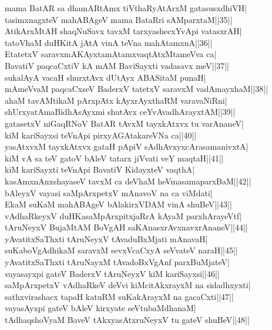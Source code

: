 \documentclass{article}
\begin{document}
mama BatAR sa dhamARtAmx tiVthaRyAtArxM gatasusxdhiVH|\\
tasimxnagxteV mahABAgeV mama BataRri sAMparxtaM||35||\\
AtikArxMtAH shaqNuSavx tavxM tarxyashecxYvApi vatasxrAH|\\
tatoVhaM duHKitA jAtA vinA teVna mahAtamxnA||36||\\
EtatetxV saravxmAKAyxtamAtamxvaqtAtxMtameVva ca|\\
BavatiV paqcaCxtiV kA mAM BaviSayxti vadasavx meV||37||\\
sukalAyA vacaH shurxtAvx dUtAyx ABASitaM punaH|\\
mAmeVvaM paqcaCxseV BaderxV tatetxV saravxM vadAmayxhaM||38||\\
ahaM tavAMtikaM pArxpAtx kAyxrAyxthaRM varavaNiRni|\\
shUrxyatAmaBidhAsAyxmi shutAvx ceYvAvadhArayxtAM||39||\\
gatasetxV niGaqRNoV BatAR tAvxM tayxkAtxvx tu varAnaneV|\\
kiM kariSayxsi teVnApi pirxyAGAtakareVNa ca||40||\\
yasAtxvxM tayxkAtxvx gataH pApiV sAdhAvxyxcArasamanivxtA|\\
kiM vA sa teV gatoV bAleV tatarx jiVvati veY maqtaH||41||\\
kiM kariSayxti teVnApi BavatiV KidayxteV vaqthA|\\
kasAmxnAnxshayaseV tavxM ca deVhaM heVmasamaparxBaM||42||\\
bAleyxV vayasi saMpArxpetxV mAnavoV na ca viMdati|\\
EkaM suKaM mahABAgeV bAlakirxVDAM vinA shuBeV||43||\\
vAdhaRkeyxV duHKasaMpArxpitxjaRrA kAyaM parxhArayeVtf|\\
tAruNeyxV BujaMtAM BoVgAH saKAnasxrAvxnavxrAnaneV||44||\\
yAvatitxSaThxti tAruNeyxV tAvaduBxMjati mAnavaH|\\
suKaboVgAdhikaM saravxM sevxVcaCxyA seVvateV naraH||45||\\
yAvatitxSaThxti tAruNayxM tAvadoBxVgAnf parxBuMjateV|\\
vayasayxpi gateV BaderxV tAruNeyxV kiM kariSayxsi||46||\\
saMpArxpetxV vAdhaRkeV deVvi kiMcitAkxrayxM na sidadhxyxti|\\
sathxvirashacx tapaH katuRM suKakArayxM na gacaCxti||47||\\
vayasAyxpi gateV bAleV kirxyate seVtubaMdhanaM|\\
tAdhaqshoVyaM BaveV tAkxyasAtxruNeyxV tu gateV shuBeV||48||\\
\end{document}
